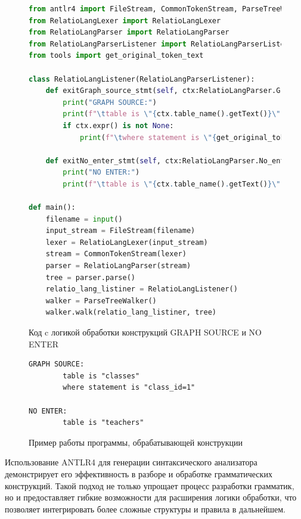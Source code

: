 \begin{figure}
  \begin{lstlisting}[language=Python]
from antlr4 import FileStream, CommonTokenStream, ParseTreeWalker
from RelatioLangLexer import RelatioLangLexer
from RelatioLangParser import RelatioLangParser
from RelatioLangParserListener import RelatioLangParserListener
from tools import get_original_token_text

class RelatioLangListener(RelatioLangParserListener):
    def exitGraph_source_stmt(self, ctx:RelatioLangParser.Graph_source_stmtContext):
        print("GRAPH SOURCE:")
        print(f"\ttable is \"{ctx.table_name().getText()}\"")
        if ctx.expr() is not None:
            print(f"\twhere statement is \"{get_original_token_text(ctx.expr())}\"")

    def exitNo_enter_stmt(self, ctx:RelatioLangParser.No_enter_stmtContext):
        print("NO ENTER:")
        print(f"\ttable is \"{ctx.table_name().getText()}\"")

def main():
    filename = input()
    input_stream = FileStream(filename)
    lexer = RelatioLangLexer(input_stream)
    stream = CommonTokenStream(lexer)
    parser = RelatioLangParser(stream)
    tree = parser.parse()
    relatio_lang_listiner = RelatioLangListener()
    walker = ParseTreeWalker()
    walker.walk(relatio_lang_listiner, tree)
  \end{lstlisting}
  \caption{Код c логикой обработки конструкций GRAPH SOURCE и NO ENTER}
  \label{antlr4-program}
\end{figure}

\begin{figure}
  \begin{lstlisting}
GRAPH SOURCE:
        table is "classes"
        where statement is "class_id=1"

NO ENTER:
        table is "teachers"
  \end{lstlisting}
  \caption{Пример работы программы, обрабатывающей конструкции}
  \label{antlr4-program-out}
\end{figure}

Использование ANTLR4 для генерации синтаксического анализатора демонстрирует его эффективность в разборе и обработке грамматических конструкций. Такой подход не только упрощает процесс разработки грамматик, но и предоставляет гибкие возможности для расширения логики обработки, что позволяет интегрировать более сложные структуры и правила в дальнейшем.
